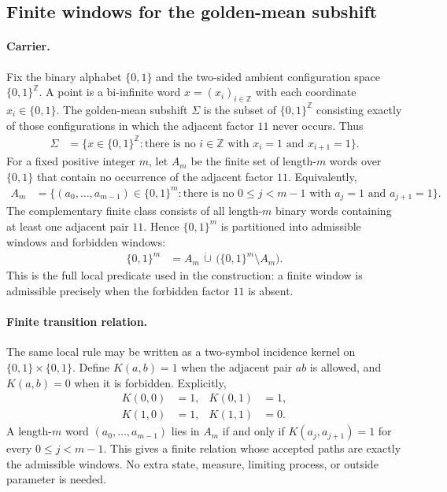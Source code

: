 
\subsection{Finite windows for the golden-mean subshift}
\label{sec:phi-m-factor-golden-mean-subshift}

\paragraph{Carrier.}
Fix the binary alphabet $\{0,1\}$ and the two-sided ambient configuration space $\{0,1\}^{\mathbb Z}$. A point is a bi-infinite word $x=(x_i)_{i\in\mathbb Z}$ with each coordinate $x_i\in\{0,1\}$. The golden-mean subshift $\Sigma$ is the subset of $\{0,1\}^{\mathbb Z}$ consisting exactly of those configurations in which the adjacent factor $11$ never occurs. Thus
$$
\begin{aligned}
\Sigma
  &= \{x\in\{0,1\}^{\mathbb Z}: \text{there is no }i\in\mathbb Z\text{ with }x_i=1\text{ and }x_{i+1}=1\}.
\end{aligned}
$$
For a fixed positive integer $m$, let $A_m$ be the finite set of length-$m$ words over $\{0,1\}$ that contain no occurrence of the adjacent factor $11$. Equivalently,
$$
\begin{aligned}
A_m
  &= \{(a_0,\ldots,a_{m-1})\in\{0,1\}^m:
      \text{there is no }0\leq j<m-1\text{ with }a_j=1\text{ and }a_{j+1}=1\}.
\end{aligned}
$$
The complementary finite class consists of all length-$m$ binary words containing at least one adjacent pair $11$. Hence $\{0,1\}^m$ is partitioned into admissible windows and forbidden windows:
$$
\begin{aligned}
\{0,1\}^m
  &= A_m\,\dot\cup\,\bigl(\{0,1\}^m\setminus A_m\bigr).
\end{aligned}
$$
This is the full local predicate used in the construction: a finite window is admissible precisely when the forbidden factor $11$ is absent.

\paragraph{Finite transition relation.}
The same local rule may be written as a two-symbol incidence kernel on $\{0,1\}\times\{0,1\}$. Define $K(a,b)=1$ when the adjacent pair $ab$ is allowed, and $K(a,b)=0$ when it is forbidden. Explicitly,
$$
\begin{aligned}
K(0,0)&=1, & K(0,1)&=1,\\
K(1,0)&=1, & K(1,1)&=0.
\end{aligned}
$$
A length-$m$ word $(a_0,\ldots,a_{m-1})$ lies in $A_m$ if and only if $K(a_j,a_{j+1})=1$ for every $0\leq j<m-1$. This gives a finite relation whose accepted paths are exactly the admissible windows. No extra state, measure, limiting process, or outside parameter is needed.

